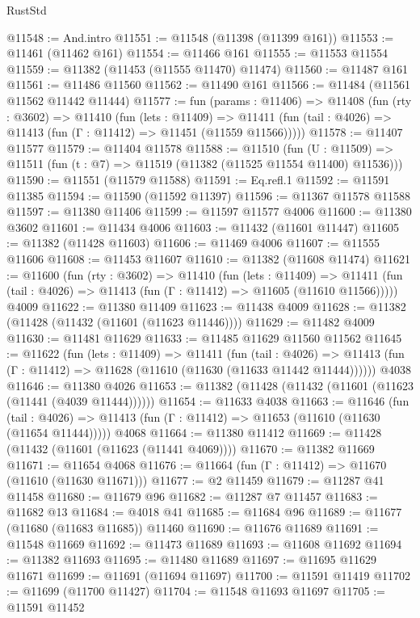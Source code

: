 \begin{lexlean}{RustStd}
\begin{coremodule}
@11548 := And.intro
@11551 := @11548 (@11398 (@11399 @161))
@11553 := @11461 (@11462 @161)
@11554 := @11466 @161
@11555 := @11553 @11554
@11559 := @11382 (@11453 (@11555 @11470) @11474)
@11560 := @11487 @161
@11561 := @11486 @11560
@11562 := @11490 @161
@11566 := @11484 (@11561 @11562 @11442 @11444)
@11577 := fun (params : @11406) =>
  @11408
    (fun (rty : @3602) =>
    @11410
      (fun (lets : @11409) =>
      @11411 (fun (tail : @4026) => @11413 (fun (Γ : @11412) => @11451 (@11559 @11566)))))
@11578 := @11407 @11577
@11579 := @11404 @11578
@11588 := @11510
    (fun (U : @11509) => @11511 (fun (t : @7) => @11519 (@11382 (@11525 @11554 @11400) @11536)))
@11590 := @11551 (@11579 @11588)
@11591 := Eq.refl.{1}
@11592 := @11591 @11385
@11594 := @11590 (@11592 @11397)
@11596 := @11367 @11578 @11588
@11597 := @11380 @11406
@11599 := @11597 @11577 @4006
@11600 := @11380 @3602
@11601 := @11434 @4006
@11603 := @11432 (@11601 @11447)
@11605 := @11382 (@11428 @11603)
@11606 := @11469 @4006
@11607 := @11555 @11606
@11608 := @11453 @11607
@11610 := @11382 (@11608 @11474)
@11621 := @11600
    (fun (rty : @3602) =>
    @11410
      (fun (lets : @11409) =>
      @11411 (fun (tail : @4026) => @11413 (fun (Γ : @11412) => @11605 (@11610 @11566)))))
    @4009
@11622 := @11380 @11409
@11623 := @11438 @4009
@11628 := @11382 (@11428 (@11432 (@11601 (@11623 @11446))))
@11629 := @11482 @4009
@11630 := @11481 @11629
@11633 := @11485 @11629 @11560 @11562
@11645 := @11622
    (fun (lets : @11409) =>
    @11411
      (fun (tail : @4026) =>
      @11413 (fun (Γ : @11412) => @11628 (@11610 (@11630 (@11633 @11442 @11444))))))
    @4038
@11646 := @11380 @4026
@11653 := @11382 (@11428 (@11432 (@11601 (@11623 (@11441 (@4039 @11444))))))
@11654 := @11633 @4038
@11663 := @11646
    (fun (tail : @4026) => @11413 (fun (Γ : @11412) => @11653 (@11610 (@11630 (@11654 @11444)))))
    @4068
@11664 := @11380 @11412
@11669 := @11428 (@11432 (@11601 (@11623 (@11441 @4069))))
@11670 := @11382 @11669
@11671 := @11654 @4068
@11676 := @11664 (fun (Γ : @11412) => @11670 (@11610 (@11630 @11671)))
@11677 := @2 @11459
@11679 := @11287 @41 @11458
@11680 := @11679 @96
@11682 := @11287 @7 @11457
@11683 := @11682 @13
@11684 := @4018 @41
@11685 := @11684 @96
@11689 := @11677 (@11680 (@11683 @11685)) @11460
@11690 := @11676 @11689
@11691 := @11548 @11669
@11692 := @11473 @11689
@11693 := @11608 @11692
@11694 := @11382 @11693
@11695 := @11480 @11689
@11697 := @11695 @11629 @11671
@11699 := @11691 (@11694 @11697)
@11700 := @11591 @11419
@11702 := @11699 (@11700 @11427)
@11704 := @11548 @11693 @11697
@11705 := @11591 @11452

\end{coremodule}
\end{lexlean}
